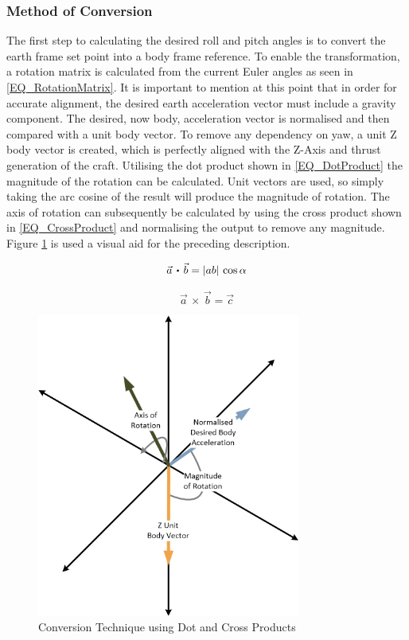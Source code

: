 		\subsubsection{Method of Conversion}	
		The first step to calculating the desired roll and pitch angles is to convert the earth frame set point into a body frame reference. To enable the transformation, a rotation matrix is calculated from the current Euler angles as seen in \eqref{EQ_RotationMatrix}. It is important to mention at this point that in order for accurate alignment, the desired earth acceleration vector must include a gravity component. The desired, now body, acceleration vector is normalised and then compared with a unit body vector. To remove any dependency on yaw, a unit Z body vector is created, which is perfectly aligned with the Z-Axis and thrust generation of the craft. Utilising the dot product shown in \eqref{EQ_DotProduct} the magnitude of the rotation can be calculated. Unit vectors are used, so simply taking the arc cosine of the result will produce the magnitude of rotation. The axis of rotation can subsequently be calculated by using the cross product shown in \eqref{EQ_CrossProduct} and normalising the output to remove any magnitude. Figure \ref{IM_AngleMethod} is used a visual aid for the preceding description.
		
 		\begin{equation}
 		\label{EQ_DotProduct}
 		\vec{a} \, \bigcdot \, \vec{b} = |ab|\,\cos \alpha
 		\end{equation}
 		
 		\begin{equation}
 		\label{EQ_CrossProduct}
 		\vec{a} \, \times \, \vec{b} = \vec{c}
 		\end{equation}
		
		\begin{figure}[H]
			\centering
			\includegraphics[height = 10cm]{../References/Diagrams/ConversionMethod.jpg}
			\caption{Conversion Technique using Dot and Cross Products}
			\label{IM_AngleMethod}
		\end{figure}
	
